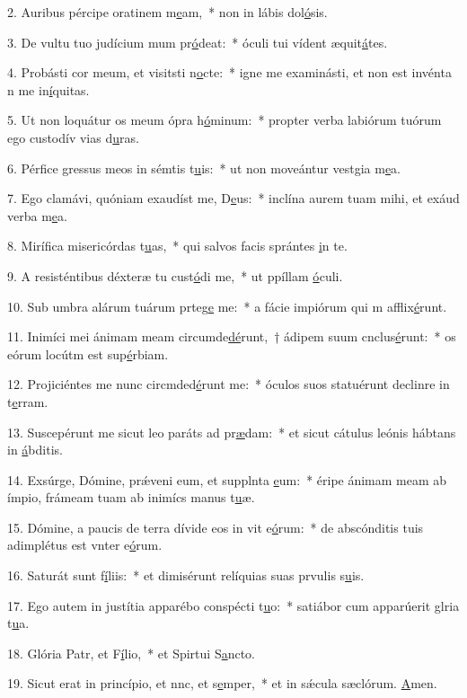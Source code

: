 2. Auribus pércipe oratinem m\uline{e}am,~* non in lábis dol\uline{ó}sis.\par 
3. De vultu tuo judícium mum pr\uline{ó}deat:~* óculi tui vídent æquit\uline{á}tes.\par 
4. Probásti cor meum, et visitsti n\uline{o}cte:~* igne me examinásti, et non est invénta n me in\uline{í}quitas.\par 
5. Ut non loquátur os meum ópra h\uline{ó}minum:~* propter verba labiórum tuórum ego custodív vias d\uline{u}ras.\par 
6. Pérfice gressus meos in sémtis t\uline{u}is:~* ut non moveántur vestgia m\uline{e}a.\par 
7. Ego clamávi, quóniam exaudíst me, D\uline{e}us:~* inclína aurem tuam mihi, et exáud verba m\uline{e}a.\par 
8. Mirífica misericórdas t\uline{u}as,~* qui salvos facis sprántes \uline{i}n te.\par 
9. A resisténtibus déxteræ tu cust\uline{ó}di me,~* ut ppíllam \uline{ó}culi.\par 
10. Sub umbra alárum tuárum prteg\uline{e} me:~* a fácie impiórum qui m afflix\uline{é}runt.\par 
11. Inimíci mei ánimam meam circumde\uline{dé}runt,~† ádipem suum cnclus\uline{é}runt:~* os eórum locútm est sup\uline{é}rbiam.\par 
12. Projiciéntes me nunc circmded\uline{é}runt me:~* óculos suos statuérunt declinre in t\uline{e}rram.\par 
13. Suscepérunt me sicut leo paráts ad pr\uline{æ}dam:~* et sicut cátulus leónis hábtans in \uline{á}bditis.\par 
14. Exsúrge, Dómine, prǽveni eum, et supplnta \uline{e}um:~* éripe ánimam meam ab ímpio, frámeam tuam ab inimícs manus t\uline{u}æ.\par 
15. Dómine, a paucis de terra dívide eos in vit e\uline{ó}rum:~* de abscónditis tuis adimplétus est vnter e\uline{ó}rum.\par 
16. Saturát sunt f\uline{í}liis:~* et dimisérunt relíquias suas prvulis s\uline{u}is.\par 
17. Ego autem in justítia apparébo conspécti t\uline{u}o:~* satiábor cum apparúerit glria t\uline{u}a.\par 
18. Glória Patr, et F\uline{í}lio,~* et Spirtui S\uline{a}ncto.\par 
19. Sicut erat in princípio, et nnc, et s\uline{e}mper,~* et in sǽcula sæclórum. \uline{A}men.\par 

